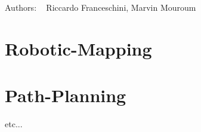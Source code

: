 Authors\+: ~\newline
Riccardo Franceschini, Marvin Mouroum ~\newline
 \hypertarget{index_Robotic-Mapping}{}\section{Robotic-\/\+Mapping}\label{index_Robotic-Mapping}
                  \hypertarget{index_Path-Planning}{}\section{Path-\/\+Planning}\label{index_Path-Planning}
etc... 
